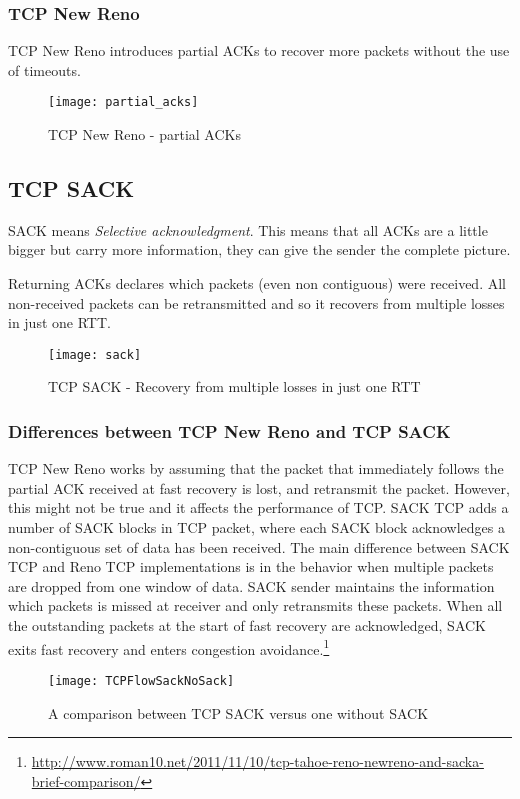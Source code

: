 \subsubsection{TCP New Reno}
TCP New Reno introduces partial ACKs to recover more packets without the use of
timeouts.
\begin{figure}[h]
  \texttt{[image: partial\_acks]}
  \caption[TCP New Reno]{TCP New Reno - partial ACKs}
\end{figure}

\subsection{TCP SACK}
SACK means \textit{Selective acknowledgment}. This means that all ACKs are a
little bigger but carry more information, they can give the sender the complete 
picture.

Returning ACKs declares which packets (even non contiguous) were received.
All non-received packets can be retransmitted and so it recovers from multiple
losses in just one RTT.
\begin{figure}[h]
  \texttt{[image: sack]}
  \caption[TCP SACK]{TCP SACK - Recovery from multiple losses in just one RTT}
\end{figure}

\subsubsection{Differences between TCP New Reno and TCP SACK}

TCP New Reno works by assuming that the packet that immediately follows the partial ACK received at fast recovery is lost, and retransmit
the packet. However, this might not be true and it affects the performance of TCP. SACK TCP adds a number of SACK blocks in TCP packet,
where each SACK block acknowledges a non-contiguous set of data has been received. The main difference between SACK TCP and Reno TCP
implementations is in the behavior when multiple packets are dropped from one window of data. SACK sender maintains the information which
packets is missed at receiver and only retransmits these packets. When all the outstanding packets at the start of fast recovery are
acknowledged, SACK exits fast recovery and enters congestion avoidance.\footnote{
  \url{http://www.roman10.net/2011/11/10/tcp-tahoe-reno-newreno-and-sacka-brief-comparison/}
}

\begin{figure}[h]
  \centering
  \texttt{[image: TCPFlowSackNoSack]}
  \caption[TCP No SACK vs TCP SACK]{A comparison between TCP SACK versus one without SACK}
  \label{fig:tcp:sackvsnosack}
\end{figure}
